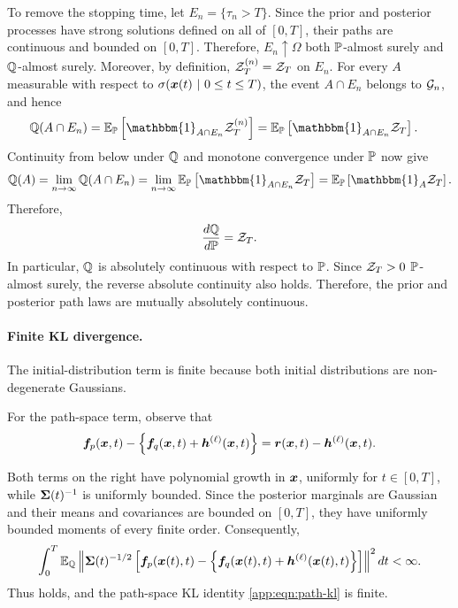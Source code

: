 To remove the stopping time, let $E_n=\{\tau_n>T\}$. 
Since the prior and posterior processes have strong solutions defined on all of $[0,T]$, their paths are continuous and bounded on $[0,T]$. 
Therefore, $E_n\uparrow\Omega$ both $\mathbb{P}$-almost surely and $\mathbb{Q}$-almost surely. 
Moreover, by definition, $\mathcal{Z}_T^{(n)}=\mathcal{Z}_T$ on $E_n$. 
For every $A$ measurable with respect to $\sigma(\boldsymbol{x}(t) \ | \ 0 \leq t \leq T)$, the event $A\cap E_n$ belongs to $\mathcal{G}_n$, and hence
\begin{equation*}
\begin{aligned}
    \bbQ(A\cap E_n) &= \bbE_{\bbP}\left[ \mathbbm{1}_{A\cap E_n}\cZ_T^{(n)}  \right] = \bbE_{\bbP}\left[\mathbbm{1}_{A\cap E_n}\cZ_T \right].
\end{aligned}
\end{equation*}
Continuity from below under $\mathbb{Q}$ and monotone convergence under
$\mathbb{P}$ now give
\begin{equation*}
    \bbQ(A) = \lim_{n\to\infty}\bbQ(A\cap E_n) = \lim_{n\to\infty} \bbE_{\bbP}\left[\mathbbm{1}_{A\cap E_n}\cZ_T \right] = \bbE_{\bbP}\left[ \mathbbm{1}_A\cZ_T \right].
\end{equation*}
Therefore,
\begin{equation*}
    \frac{d\mathbb{Q}}{d\mathbb{P}}  = \mathcal{Z}_T.
\end{equation*}
In particular, $\mathbb{Q}$ is absolutely continuous with respect to $\mathbb{P}$. 
Since $\mathcal{Z}_T>0$ $\mathbb{P}$-almost surely, the reverse absolute continuity also holds. 
Therefore, the prior and posterior path laws are mutually absolutely continuous.

\paragraph{Finite KL divergence.}
The initial-distribution term is finite because both initial distributions are non-degenerate Gaussians.

For the path-space term, observe that
\begin{equation*}
    \boldsymbol{f}_p(\boldsymbol{x},t) -\left\{\boldsymbol{f}_q(\boldsymbol{x},t)+\boldsymbol{h}^{(\ell)}(\boldsymbol{x},t)\right\}  =\boldsymbol{r}(\boldsymbol{x},t)-\boldsymbol{h}^{(\ell)}(\boldsymbol{x},t).
\end{equation*}

Both terms on the right have polynomial growth in $\boldsymbol{x}$, uniformly for $t\in[0,T]$, while $\boldsymbol{\Sigma}(t)^{-1}$ is uniformly bounded.
Since the posterior marginals are Gaussian and their means and covariances are bounded on $[0,T]$, they have uniformly bounded moments of every finite order.
Consequently,
\begin{equation*}
    \int_0^T \mathbb{E}_{\mathbb{Q}} \left\|    \boldsymbol{\Sigma}(t)^{-1/2} \left[ \boldsymbol{f}_p(\boldsymbol{x}(t),t) -\left\{\boldsymbol{f}_q(\boldsymbol{x}(t),t) +\boldsymbol{h}^{(\ell)}(\boldsymbol{x}(t),t)\right\}  \right] \right\|^2dt <\infty.
\end{equation*}
Thus  holds, and the path-space KL identity \cref{app:eqn:path-kl} is finite.

